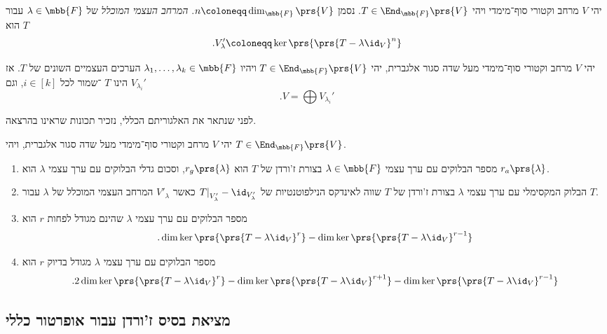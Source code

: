 \documentclass[a4paper,10pt,twoside,openany]{book}
\begin{document}
\begin{definition}
יהי
$V$
מרחב וקטורי סוף־מימדי ויהי
$T \in \End_{\mbb{F}}\prs{V}$.
נסמן
$n \coloneqq \dim_{\mbb{F}}\prs{V}$.
\emph{המרחב העצמי המוכלל}
של
$\lambda \in \mbb{F}$
עבור
$T$
הוא
\[\text{.} V_{\lambda}' \coloneqq \ker\prs{\prs{T - \lambda \id_V}^n}\]
\end{definition}

\begin{theorem}
יהי
$V$
מרחב וקטורי סוף־מימדי מעל שדה סגור אלגברית, יהי
$T \in \End_{\mbb{F}}\prs{V}$
ויהיו
$\lambda_1, \ldots, \lambda_k \in \mbb{F}$
הערכים העצמיים השונים של
$T$.
אז
$V_{\lambda_i}'$
הינו
$T$%
־שמור לכל
$i \in [k]$,
וגם
\[\text{.} V = \bigoplus V_{\lambda_i}'\]
\end{theorem}

לפני שנתאר את האלגוריתם הכללי, נזכיר תכונות שראינו בהרצאה.

\begin{proposition}
יהי
$V$
מרחב וקטורי סוף־מימדי מעל שדה סגור אלגברית, ויהי
$T \in \End_{\mbb{F}}\prs{V}$.

\begin{enumerate}
\item 
מספר הבלוקים עם ערך עצמי
$\lambda \in \mbb{F}$
בצורת ז'ורדן של
$T$
הוא
$r_g\prs{\lambda}$,
וסכום גדלי הבלוקים עם ערך עצמי
$\lambda$
הוא
$r_a\prs{\lambda}$.

\item
הבלוק המקסימלי עם ערך עצמי
$\lambda$
בצורת ז'ורדן של
$T$
שווה לאינדקס הנילפוטנטיות של
$\left. T \right|_{V'_\lambda} - \id_{V'_\lambda}$
כאשר
$V'_\lambda$
המרחב העצמי המוכלל של
$\lambda$
עבור
$T$.

\item מספר הבלוקים עם ערך עצמי
$\lambda$
שהינם מגודל לפחות
$r$
הוא
\[\text{.} \dim \ker\prs{\prs{T - \lambda \id_V}^r} - \dim \ker\prs{\prs{T - \lambda \id_V}^{r-1}}\]

\item מספר הבלוקים עם ערך עצמי
$\lambda$
מגודל בדיוק
$r$
הוא
\[\text{.} 2 \dim \ker\prs{\prs{T - \lambda \id_V}^r} - \dim \ker\prs{\prs{T - \lambda \id_V}^{r+1}} - \dim \ker\prs{\prs{T - \lambda \id_V}^{r-1}}\]
\end{enumerate}
\end{proposition}


\subsection{מציאת בסיס ז'ורדן עבור אופרטור כללי}
\end{document}
